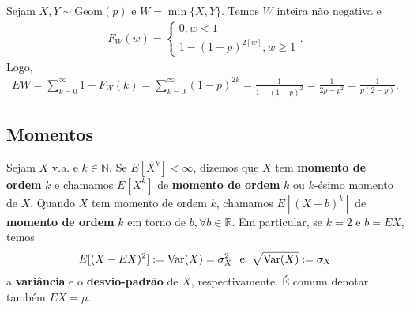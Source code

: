 \documentclass[../Notas.tex]{subfiles}
\begin{document}
\begin{example}
Sejam $X, Y\sim\text{Geom}(p)$ e $W = \min\{X,Y\}$. Temos $W$ inteira não negativa e
\begin{align*}
    F_W(w) = \begin{cases}
    0, w < 1 \\
    1 - (1-p)^{2[w]}, w\geq 1
    \end{cases}.
\end{align*}
Logo, 
\begin{align*}
    EW = \sum_{k=0}^{\infty} 1 - F_W(k) = \sum_{k=0}^{\infty} (1-p)^{2k} = \frac{1}{1-(1-p)^2} = \frac{1}{2p-p^2} = \frac{1}{p(2-p)}.
\end{align*}
\end{example}

\subsection{Momentos}
\begin{definition}
Sejam $X$ v.a. e $k\in\mathbb{N}$. Se $E[X^k]<\infty$, dizemos que $X$ tem \textbf{momento de ordem} $k$ e chamamos $E[X^k]$ de \textbf{momento de ordem} $k$ ou $k$-ésimo momento de $X$. Quando $X$ tem momento de ordem $k$, chamamos $E[(X-b)^k]$ de \textbf{momento de ordem} $k$ em torno de $b, \forall b\in\mathbb{R}$. Em particular, se $k=2$ e $b=EX$, temos
\begin{align*}
    E[(X-EX)^2] := \text{Var}(X) = \sigma_X^2 \ \text{ e } \ \sqrt{\text{Var}(X)} := \sigma_X
\end{align*}
a \textbf{variância} e o \textbf{desvio-padrão} de $X$, respectivamente. É comum denotar também $EX = \mu$.
\end{definition}
\end{document}
